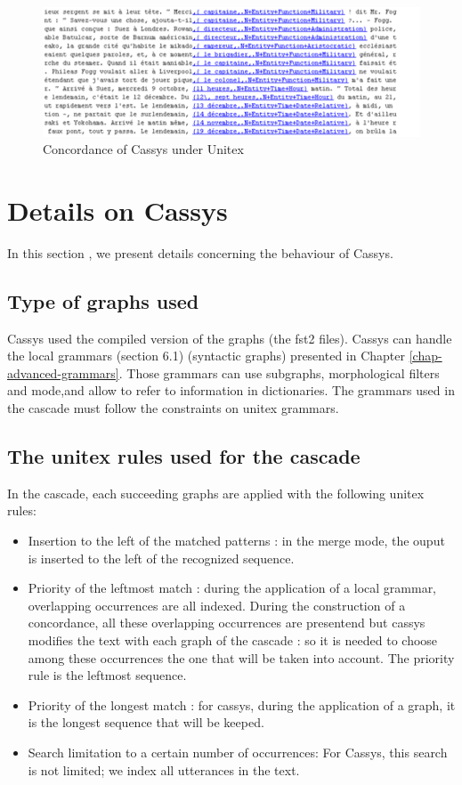 \begin{figure}[!htb]
  \centering
  \includegraphics[width=14cm]{resources/img/fig13-04.png}
  \caption{Concordance of Cassys under Unitex}
  \label{fig13-04}
\end{figure}

\section{Details on Cassys}

In this section , we present details concerning the behaviour of Cassys.

\subsection{Type of graphs used}

Cassys used the compiled version of the graphs (the fst2 files).
Cassys can handle the local grammars (section 6.1) (syntactic graphs) presented in Chapter \ref{chap-advanced-grammars}. Those grammars can use subgraphs, 
morphological filters and mode,and allow to refer to information in dictionaries. 
The grammars used in the cascade must follow the constraints on unitex grammars.

\subsection{The unitex rules used for the cascade}

In the cascade, each succeeding graphs are applied with the following unitex rules:
\begin{itemize}
	\item Insertion to the left of the matched patterns : in the merge mode, the ouput is inserted to the left of the recognized sequence.
	\item	Priority of the leftmost match : during the application of a local grammar, overlapping occurrences are all indexed. 
	During the construction of a concordance, all these overlapping occurrences are presentend but cassys modifies the text with each 
	graph of the cascade : so it is needed to choose among these occurrences the one that will be taken into account. The priority rule 
	is the leftmost sequence.
	\item Priority of the longest match : for cassys, during the application of a graph, it is the longest sequence 
	that will be keeped.
	\item	Search limitation to a certain number of occurrences: For Cassys, this search is not limited; we index all utterances in the text.
\end{itemize}

